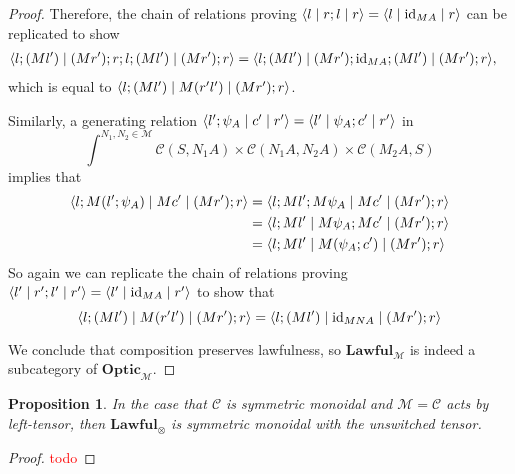 \documentclass[11pt,a4paper]{article}
\theoremstyle{plain}
\newtheorem{proposition}[theorem]{Proposition}
\theoremstyle{definition}
\newcommand{\C}{\mathscr{C}}
\newcommand{\M}{\mathscr{M}}
\newcommand{\Optic}{\mathbf{Optic}}
\newcommand{\Lawful}{\mathbf{Lawful}}
\newcommand{\id}{\mathrm{id}}
\newcommand{\repthree}[3]{{\ensuremath \langle #1 \mid #2 \mid #3 \rangle}}
\newcommand{\todo}[1]{\textcolor{red}{\small #1}}
\begin{document}
\begin{proof}
  Therefore, the chain of relations proving $\repthree{l}{r;l}{r } = \repthree{l}{\id_{MA}}{r }$ can be replicated to show
  \begin{align*}
    \repthree{l;(Ml')}{(Mr');r;l;(Ml')}{(Mr') ; r } &= \repthree{l;(Ml')}{(Mr');\id_{MA};(Ml')}{(Mr') ; r },
  \end{align*}
  which is equal to $\repthree{l;(Ml')}{M(r'l')}{(Mr') ; r }$.

  Similarly, a generating relation $\repthree{l';\psi_A}{c'}{r' } = \repthree{l'}{\psi_A ; c'}{r' }$ in \[\int^{N_1, N_2 \in \M} \C(S, N_1 A) \times \C(N_1 A, N_2 A) \times \C(M_2 A, S)\]
  implies that
  \begin{align*}
    \repthree{l;M(l';\psi_A)}{Mc'}{(Mr') ; r }
    &= \repthree{l;Ml';M\psi_A}{Mc'}{(Mr') ; r } \\
    &= \repthree{l;Ml'}{M\psi_A ; Mc'}{(Mr') ; r } \\
    &= \repthree{l;Ml'}{M(\psi_A;c')}{(Mr') ; r }
  \end{align*}
  So again we can replicate the chain of relations proving $\repthree{l'}{r';l'}{r' } = \repthree{l'}{\id_{MA}}{r' }$ to show that
  \[\repthree{l;(Ml')}{M(r'l')}{(Mr') ; r } = \repthree{l;(Ml')}{\id_{MNA}}{(Mr') ; r } \]

  We conclude that composition preserves lawfulness, so $\Lawful_\M$ is indeed a subcategory of $\Optic_\M$.
\end{proof}

\begin{proposition}
  In the case that $\C$ is symmetric monoidal and $\M = \C$ acts by left-tensor, then $\Lawful_\otimes$ is symmetric monoidal with the unswitched tensor.
\end{proposition}
\begin{proof}
\todo{todo}
\end{proof}
\end{document}
